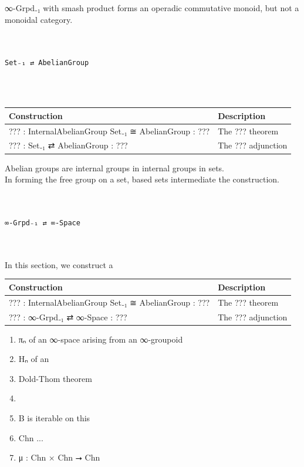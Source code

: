 \documentclass{book}
\theoremstyle{definition}
\renewcommand{\chapter}[1]{
\newpage
{
\Huge 
\begin{center}
\ \\
\ \\
\thispagestyle{empty}
\texttt{#1}
\end{center}}
\ \\
\ \\
}
\begin{document}

∞-Grpd₋₁ with smash product forms an operadic commutative monoid, but not a monoidal category.\\


\newpage
\chapter{Set₋₁ ⇄ AbelianGroup}


{
\footnotesize
\begin{center}
\begin{tabular}{||l | l ||} 
 \hline
 Construction & Description \\
 \hline
??? : InternalAbelianGroup Set₋₁ ≅ AbelianGroup : ???  & The ??? theorem \\
\hline
??? : Set₋₁ ⇄ AbelianGroup : ??? & The ??? adjunction \\
 \hline
\end{tabular}
\end{center}
}

Abelian groups are internal groups in internal groups in sets.\\


In forming the free group on a set, based sets intermediate the construction.\\



\newpage
\chapter{∞-Grpd₋₁ ⇄ ∞-Space}

In this section, we construct a 
{
\footnotesize
\begin{center}
\begin{tabular}{||l | l ||} 
 \hline
 Construction & Description \\
 \hline
 ??? : InternalAbelianGroup Set₋₁ ≅ AbelianGroup : ???  & The ??? theorem \\
\hline
 ??? : ∞-Grpd₋₁ ⇄ ∞-Space : ??? & The ??? adjunction \\
 \hline
\end{tabular}
\end{center}
}


\begin{enumerate}
\item πₙ of an ∞-space arising from an ∞-groupoid
\item Hₙ of an 
\item Dold-Thom theorem
\item 
\item B is iterable on this
\item Chn ... 
\item μ : Chn × Chn ⭢ Chn
\end{enumerate}
\end{document}
